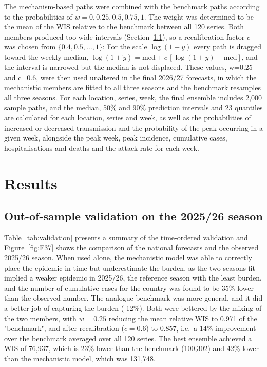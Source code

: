 \documentclass[12pt,a4paper]{article}
\theoremstyle{definition}
\theoremstyle{remark}
\begin{document}
The mechanism-based paths were combined with the benchmark paths according to the probabilities of $w=0,0.25,0.5,0.75,1$. The weight was determined to be the mean of the WIS relative to the benchmark between all 120 series. Both members produced too wide intervals (Section~\ref{sec:validation_results}), so a recalibration factor $c$ was chosen from $\{0.4,0.5,\dots,1\}$: For the scale $\log(1+y)$ every path is dragged toward the weekly median, $\log(1+\tilde{y})=\mathrm{med}+c\,[\log(1+y)-\mathrm{med}]$, and the interval is narrowed but the median is not displaced. These values, w=0.25 and c=0.6, were then used unaltered in the final 2026/27 forecasts, in which the mechanistic members are fitted to all three seasons and the benchmark resamples all three seasons. For each location, series, week, the final ensemble includes 2{,}000 sample paths, and the median, 50\% and 90\% prediction intervals and 23 quantiles are calculated for each location, series and week, as well as the probabilities of increased or decreased transmission and the probability of the peak occurring in a given week, alongside the peak week, peak incidence, cumulative cases, hospitalisations and deaths and the attack rate for each week.


\section{Results}\label{sec:results}

\subsection{Out-of-sample validation on the 2025/26 season}\label{sec:validation_results}

Table~\ref{tab:validation} presents a summary of the time-ordered validation and Figure~\ref{fig:F37} shows the comparison of the national forecasts and the observed 2025/26 season. When used alone, the mechanistic model was able to correctly place the epidemic in time but underestimate the burden, as the two seasons fit implied a weaker epidemic in 2025/26, the reference season with the least burden, and the number of cumulative cases for the country was found to be 35\% lower than the observed number. The analogue benchmark was more general, and it did a better job of capturing the burden (-12\%). Both were bettered by the mixing of the two members, with $w=0.25$ reducing the mean relative WIS to 0.971 of the "benchmark", and after recalibration ($c=0.6$) to 0.857, i.e.\ a 14\% improvement over the benchmark averaged over all 120 series. The best ensemble achieved a WIS of 76{,}937, which is 23\% lower than the benchmark (100{,}302) and 42\% lower than the mechanistic model, which was 131{,}748.
\end{document}
